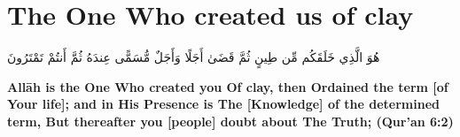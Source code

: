 \chapter{The One Who created us of clay}
\begin{center}
    {\Huge    
        \begin{Arabic}
            هُوَ الَّذِي خَلَقَكُم مِّن طِينٍ ثُمَّ قَضَىٰ أَجَلًا وَأَجَلٌ مُّسَمًّى عِندَهُ ثُمَّ أَنتُمْ تَمْتَرُونَ
        \end{Arabic}
    }    
\end{center}
\vspace*{\fill}
\vspace{3cm}
\begin{center}
    \large \textbf{Allāh is the One Who created you Of clay, then Ordained the term [of Your life]; and in His Presence is The [Knowledge] of the determined term, But thereafter you [people] doubt about The Truth; (Qur'an 6:2)}
\end{center}
